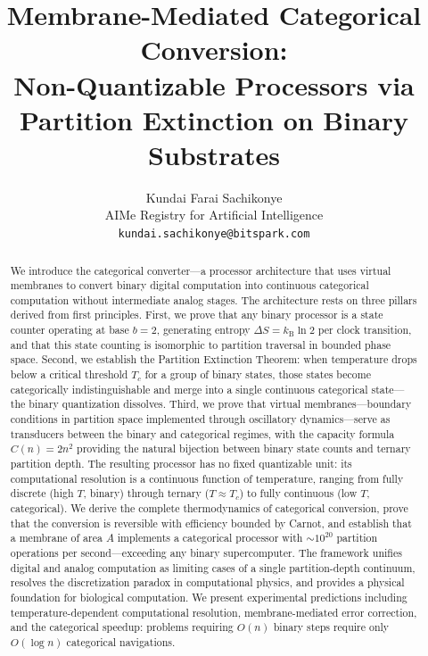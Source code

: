 \documentclass[twocolumn,10pt]{article}
\title{\textbf{Membrane-Mediated Categorical Conversion: \\Non-Quantizable Processors via Partition Extinction on Binary Substrates}}
\author{
Kundai Farai Sachikonye\\
AIMe Registry for Artificial Intelligence\\
\texttt{kundai.sachikonye@bitspark.com}
}
\date{}
\theoremstyle{remark}
\newcommand{\kB}{k_{\mathrm{B}}}
\begin{document}
\maketitle

\begin{abstract}
\noindent We introduce the categorical converter---a processor architecture that uses virtual membranes to convert binary digital computation into continuous categorical computation without intermediate analog stages. The architecture rests on three pillars derived from first principles. First, we prove that any binary processor is a state counter operating at base $b = 2$, generating entropy $\Delta S = \kB \ln 2$ per clock transition, and that this state counting is isomorphic to partition traversal in bounded phase space. Second, we establish the Partition Extinction Theorem: when temperature drops below a critical threshold $T_c$ for a group of binary states, those states become categorically indistinguishable and merge into a single continuous categorical state---the binary quantization dissolves. Third, we prove that virtual membranes---boundary conditions in partition space implemented through oscillatory dynamics---serve as transducers between the binary and categorical regimes, with the capacity formula $C(n) = 2n^2$ providing the natural bijection between binary state counts and ternary partition depth. The resulting processor has no fixed quantizable unit: its computational resolution is a continuous function of temperature, ranging from fully discrete (high $T$, binary) through ternary ($T \approx T_c$) to fully continuous (low $T$, categorical). We derive the complete thermodynamics of categorical conversion, prove that the conversion is reversible with efficiency bounded by Carnot, and establish that a membrane of area $A$ implements a categorical processor with $\sim 10^{20}$ partition operations per second---exceeding any binary supercomputer. The framework unifies digital and analog computation as limiting cases of a single partition-depth continuum, resolves the discretization paradox in computational physics, and provides a physical foundation for biological computation. We present experimental predictions including temperature-dependent computational resolution, membrane-mediated error correction, and the categorical speedup: problems requiring $O(n)$ binary steps require only $O(\log n)$ categorical navigations.
\end{abstract}

\end{document}
